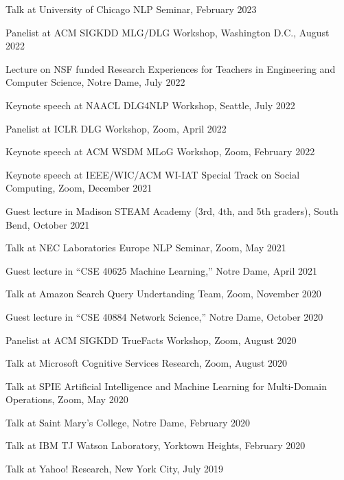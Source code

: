\documentclass[10pt]{article}
\newenvironment{myindentpar}[1]%
{\begin{list}{}%
         {\setlength{\leftmargin}{#1}}%
         \item[]%
}
{\end{list}}
\newcounter{list}
\begin{document}
\begin{myindentpar}{0.75cm}

\hspace{-0.75cm} Talk at University of Chicago NLP Seminar, February 2023
	
\hspace{-0.75cm} Panelist at ACM SIGKDD MLG/DLG Workshop, Washington D.C., August 2022
	
\hspace{-0.75cm} Lecture on NSF funded Research Experiences for Teachers in Engineering and Computer Science, Notre Dame, July 2022
	
\hspace{-0.75cm} Keynote speech at NAACL DLG4NLP Workshop, Seattle, July 2022
	
\hspace{-0.75cm} Panelist at ICLR DLG Workshop, Zoom, April 2022
	
\hspace{-0.75cm} Keynote speech at ACM WSDM MLoG Workshop, Zoom, February 2022
	
\hspace{-0.75cm} Keynote speech at IEEE/WIC/ACM WI-IAT Special Track on Social Computing, Zoom, December 2021
	
\hspace{-0.75cm} Guest lecture in Madison STEAM Academy (3rd, 4th, and 5th graders), South Bend, October 2021
	
\hspace{-0.75cm} Talk at NEC Laboratories Europe NLP Seminar, Zoom, May 2021
	
\hspace{-0.75cm} Guest lecture in ``CSE 40625 Machine Learning,'' Notre Dame, April 2021
	
\hspace{-0.75cm} Talk at Amazon Search Query Undertanding Team, Zoom, November 2020

\hspace{-0.75cm} Guest lecture in ``CSE 40884 Network Science,'' Notre Dame, October 2020

\hspace{-0.75cm} Panelist at ACM SIGKDD TrueFacts Workshop, Zoom, August 2020
	
\hspace{-0.75cm} Talk at Microsoft Cognitive Services Research, Zoom, August 2020
	
\hspace{-0.75cm} Talk at SPIE Artificial Intelligence and Machine Learning for Multi-Domain Operations, Zoom, May 2020
	
\hspace{-0.75cm} Talk at Saint Mary's College, Notre Dame, February 2020
	
\hspace{-0.75cm} Talk at IBM TJ Watson Laboratory, Yorktown Heights, February 2020
	
\hspace{-0.75cm} Talk at Yahoo! Research, New York City, July 2019

	
\end{myindentpar}
\end{document}
